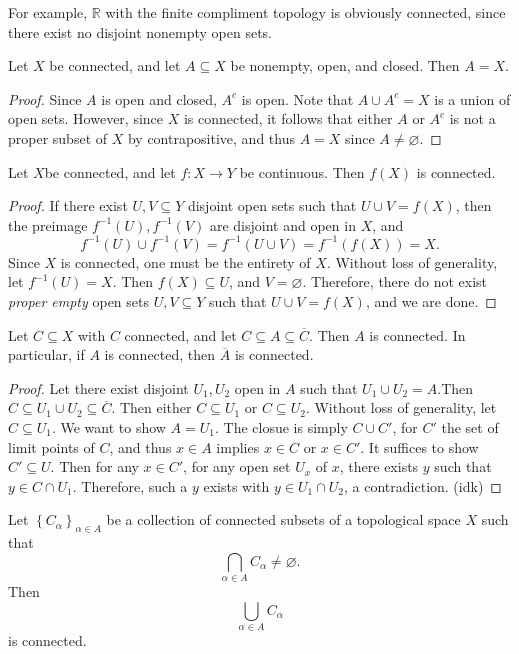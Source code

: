 For example, $\mathbb{R} $ with the finite compliment topology is obviously connected, since there exist no disjoint nonempty open sets.

\begin{proposition}\label{prp:4.1}
	Let $X$ be connected, and let $A\subseteq X$ be nonempty, open, and closed. Then $A=X$.
\end{proposition}
\begin{proof}
	Since $A$ is open and closed, $A^{c} $ is open. Note that $A\cup A^{c} =X$ is a union of open sets. However, since $X$ is connected, it follows that either $A$ or $A^{c} $ is not a proper subset of $X$ by contrapositive, and thus $A=X$ since $A\neq \varnothing $.
\end{proof}
\begin{theorem}\label{thm:4.1}
	Let $X$be connected, and let $f : X \to Y$ be continuous. Then $f(X)$ is connected.
\end{theorem}
\begin{proof}
	If there exist $U,V\subseteq Y$ disjoint open sets such that $U \cup V=f(X)$, then the preimage $f^{-1} (U),f^{-1} (V)$ are disjoint and open in $X$, and
	\[
		f^{-1} (U)\cup f^{-1} (V)=f^{-1} (U \cup V)=f^{-1} (f(X))=X
	.\]
	Since $X$ is connected, one must be the entirety of $X$. Without loss of generality, let $f^{-1} (U)=X$. Then $f(X)\subseteq U$, and $V=\varnothing $. Therefore, there do not exist \emph{proper empty} open sets $U,V\subseteq Y$ such that $U\cup V=f(X)$, and we are done.
\end{proof}
\begin{theorem}\label{thm:4.2}
	Let $C\subseteq X$ with $C$ connected, and let $C\subseteq A\subseteq \overline{C} $. Then $A$ is connected. In particular, if $A$ is connected, then $\overline{A} $ is connected.
\end{theorem}
\begin{proof}
	Let there exist disjoint $U_1,U_2$ open in $A$ such that $U_1 \cup U_2=A$.Then $C\subseteq U_1 \cup U_2 \subseteq \overline{C} $. Then either $C\subseteq U_1$ or $C\subseteq U_2$. Without loss of generality, let $C\subseteq U_1$. We want to show $A=U_1$. The closue is simply $C\cup C'$, for $C'$ the set of limit points of $C$, and thus $x\in A$ implies $x\in C$ or $x\in C'$. It suffices to show $C'\subseteq U$. Then for any $x\in C'$, for any open set $U_x$ of $x$, there exists $y$ such that $y\in C \cap U_1$. Therefore, such a $y$ exists with $y\in U_1 \cap U_2$, a contradiction. (idk)
\end{proof}
\begin{theorem}\label{thm:4.3}
	Let $\left\{ C_{\alpha } \right\}_{\alpha \in A} $ be a collection of connected subsets of a topological space $X$ such that
	\[
		\bigcap_{\alpha \in A} C_\alpha \neq \varnothing 
	.\]
	Then
	\[
		\bigcup_{\alpha \in A} C_\alpha 
	\]
	is connected.
\end{theorem}
